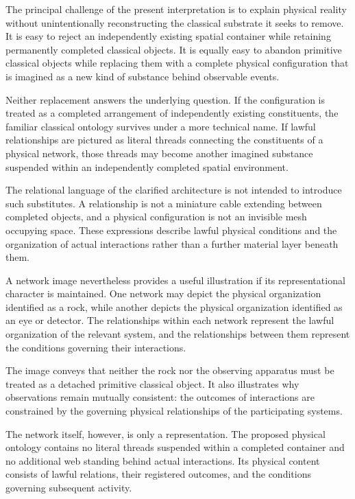 \documentclass[12pt,onecolumn]{article}
\begin{document}
The principal challenge of the present interpretation is to explain physical reality without unintentionally reconstructing the classical substrate it seeks to remove. It is easy to reject an independently existing spatial container while retaining permanently completed classical objects. It is equally easy to abandon primitive classical objects while replacing them with a complete physical configuration that is imagined as a new kind of substance behind observable events.

Neither replacement answers the underlying question. If the configuration is treated as a completed arrangement of independently existing constituents, the familiar classical ontology survives under a more technical name. If lawful relationships are pictured as literal threads connecting the constituents of a physical network, those threads may become another imagined substance suspended within an independently completed spatial environment.

The relational language of the clarified architecture is not intended to introduce such substitutes. A relationship is not a miniature cable extending between completed objects, and a physical configuration is not an invisible mesh occupying space. These expressions describe lawful physical conditions and the organization of actual interactions rather than a further material layer beneath them.

A network image nevertheless provides a useful illustration if its representational character is maintained. One network may depict the physical organization identified as a rock, while another depicts the physical organization identified as an eye or detector. The relationships within each network represent the lawful organization of the relevant system, and the relationships between them represent the conditions governing their interactions.

The image conveys that neither the rock nor the observing apparatus must be treated as a detached primitive classical object. It also illustrates why observations remain mutually consistent: the outcomes of interactions are constrained by the governing physical relationships of the participating systems.

The network itself, however, is only a representation. The proposed physical ontology contains no literal threads suspended within a completed container and no additional web standing behind actual interactions. Its physical content consists of lawful relations, their registered outcomes, and the conditions governing subsequent activity.
\end{document}
